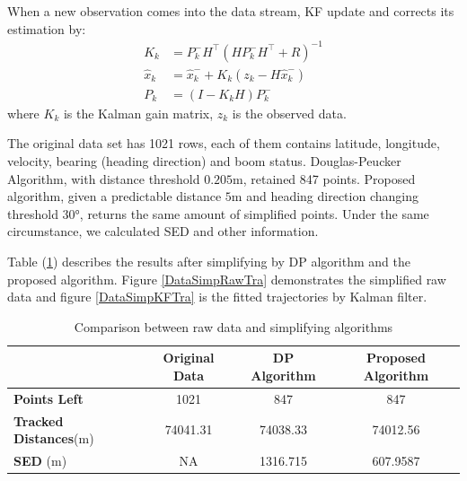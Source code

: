 When a new observation comes into the data stream, KF update and corrects its estimation by: 
\begin{align*}
K_k&=P_k^-H^\top (HP_k^-H^\top+R)^{-1} \\
\hat{x}_k&=\hat{x}_k^-+K_k(z_k-H\hat{x}_k^-) \\
P_k&=(I-K_kH)P_k^-
\end{align*}
where $K_k$ is the Kalman gain matrix, $z_k$ is the observed data.


The original data set has 1021 rows, each of them contains latitude, longitude, velocity, bearing (heading direction) and boom status. Douglas-Peucker Algorithm, with distance threshold $0.205$m, retained 847 points. Proposed algorithm, given a predictable distance $5$m and heading direction changing threshold $\ang{30}$, returns the same amount of simplified points. Under the same circumstance, we calculated SED and other information. 

Table (\ref{DataSimpCompTable}) describes the results after simplifying by DP algorithm and the proposed algorithm. Figure \ref{DataSimpRawTra} demonstrates the simplified raw data and figure \ref{DataSimpKFTra} is the fitted trajectories by Kalman filter. 

\begin{table}
\centering
\caption{Comparison between raw data and simplifying algorithms}
\label{DataSimpCompTable}
\begin{tabular}{|l|c|c|c|}
\hline 
  & \textbf{Original Data} & \textbf{DP Algorithm} & \textbf{Proposed Algorithm}  \\
\hline 
\textbf{Points Left} & 1021              & 847         & 847         \\
\textbf{Tracked Distances}(m)  & 74041.31     & 74038.33    & 74012.56     \\
\textbf{SED} (m)    & NA        & 1316.715    & 607.9587   \\
\hline 
\end{tabular}
\end{table}


